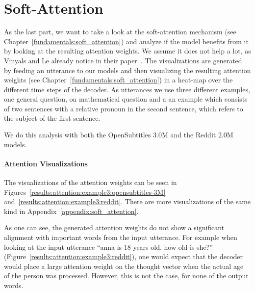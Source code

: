 \section{Soft-Attention}
\label{results:soft_attention}
As the last part, we want to take a look at the soft-attention mechanism (see Chapter~\ref{fundamentals:soft_attention}) and analyze if the model benefits from it by looking at the resulting attention weights. We assume it does not help a lot, as Vinyals and Le already notice in their paper~\cite{Vinyals:2015}. The visualizations are generated by feeding an utterance to our models and then visualizing the resulting attention weights (see Chapter~\ref{fundamentals:soft_attention}) in a heat-map over the different time steps of the decoder. As utterances we use three different examples, one general question, on mathematical question and a an example which consists of two sentences with a relative pronoun in the second sentence, which refers to the subject of the first sentence.

We do this analysis with both the OpenSubtitles 3.0M and the Reddit 2.0M models.

\paragraph{Attention Visualizations} The visualizations of the attention weights can be seen in Figures~\ref{results:attention:example3:opensubtitles-3M} and~\ref{results:attention:example3:reddit}. There are more visualizations of the same kind in Appendix~\ref{appendix:soft_attention}.

As one can see, the generated attention weights do not show a significant alignment with important words from the input utterance. For example when looking at the input utterance ``anna is 18 years old. how old is she?'' (Figure~\ref{results:attention:example3:reddit}), one would expect that the decoder would place a large attention weight on the thought vector when the actual age of the person was processed. However, this is not the case, for none of the output words.

